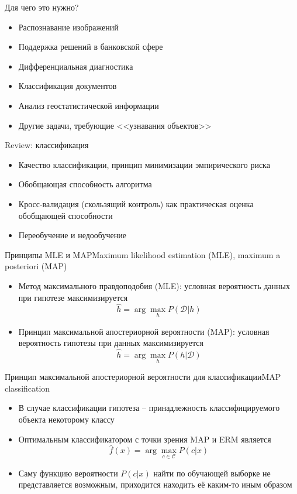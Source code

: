 \documentclass[compress,red,unicode]{beamer}
\begin{document}
\begin{frame}{Для чего это нужно?}{}
\begin{itemize}
	\item Распознавание изображений
	\item Поддержка решений в банковской сфере
	\item Дифференциальная диагностика
	\item Классификация документов
	\item Анализ геостатистической информации
	\item Другие задачи, требующие <<узнавания объектов>>
\end{itemize}
\end{frame}

\begin{frame}{Review: классификация}
\begin{itemize}
	\item Качество классификации, принцип минимизации эмпирического риска
	\item Обобщающая способность алгоритма
	\item Кросс-валидация (скользящий контроль) как практическая оценка обобщающей способности
	\item Переобучение и недообучение
\end{itemize}
\end{frame}




\begin{frame}{Принципы MLE и MAP}{Maximum likelihood estimation (MLE), maximum a posteriori (MAP)}
\begin{itemize}
\item Метод максимального правдоподобия (MLE): условная вероятность данных при гипотезе максимизируется
$$
\hat h = \arg\max_h P(\mathcal{D}|h)
$$
\item Принцип максимальной апостериорной вероятности (MAP): условная вероятность гипотезы при данных максимизируется
$$
\hat h = \arg\max_h P(h|\mathcal{D})
$$
\end{itemize}
\end{frame}

\begin{frame}{Принцип максимальной апостериорной вероятности для классификации}{MAP classification}
\begin{itemize}
	\item В случае классификации гипотеза -- принадлежность классифицируемого объекта некоторому классу

	\item Оптимальным классификатором с точки зрения MAP и ERM является
$$
\hat f(x) = \arg\max_{c \in \mathcal{C}} P(c | x)
$$
	\item Саму функцию вероятности $P(c|x)$ найти по обучающей выборке не представляется возможным, приходится находить её каким-то иным образом
\end{itemize}
\end{frame}
\end{document}
